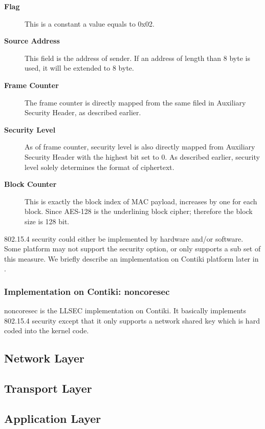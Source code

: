 \begin{description}
\item[\textbf{Flag}]
This is a constant a value equals to 0x02.
\item[\textbf{Source Address}]
This field is the address of sender. If an address of length than 8 byte is used, it will be extended to 8 byte.
\item[\textbf{Frame Counter}]
The frame counter is directly mapped from the same filed in Auxiliary Security Header, as described earlier.
\item[\textbf{Security Level}]
As of frame counter, security level is also directly mapped from Auxiliary Security Header with the highest bit set to $0$. As described earlier, security level solely determines the format of ciphertext.
\item[\textbf{Block Counter}]
This is exactly the block index of MAC payload, increases by one for each block. Since AES-128 is the underlining block cipher; therefore the block size is 128 bit.
\end{description}

802.15.4 security could either be implemented by hardware and/or software. Some platform may not support the security option, or only supports a sub set of this measure. We briefly describe an implementation on Contiki platform later in .

\subsubsection{Implementation on Contiki: noncoresec} \label{Subsubsec: noncoresec}
noncoresec is the LLSEC implementation on Contiki. It basically implements 802.15.4 security except that it only supports a network shared key which is hard coded into the kernel code.

\subsection{Network Layer}

\subsection{Transport Layer}

\subsection{Application Layer}

